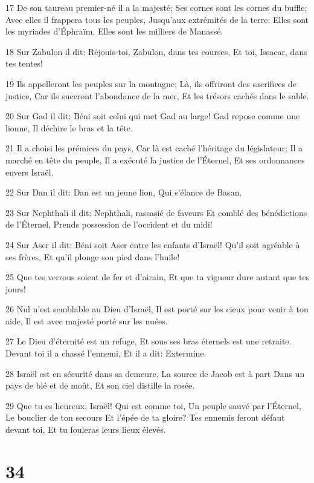 \par 17 De son taureau premier-né il a la majesté; Ses cornes sont les cornes du buffle; Avec elles il frappera tous les peuples, Jusqu'aux extrémités de la terre: Elles sont les myriades d'Éphraïm, Elles sont les milliers de Manassé.
\par 18 Sur Zabulon il dit: Réjouis-toi, Zabulon, dans tes courses, Et toi, Issacar, dans tes tentes!
\par 19 Ils appelleront les peuples sur la montagne; Là, ils offriront des sacrifices de justice, Car ils suceront l'abondance de la mer, Et les trésors cachés dans le sable.
\par 20 Sur Gad il dit: Béni soit celui qui met Gad au large! Gad repose comme une lionne, Il déchire le bras et la tête.
\par 21 Il a choisi les prémices du pays, Car là est caché l'héritage du législateur; Il a marché en tête du peuple, Il a exécuté la justice de l'Éternel, Et ses ordonnances envers Israël.
\par 22 Sur Dan il dit: Dan est un jeune lion, Qui s'élance de Basan.
\par 23 Sur Nephthali il dit: Nephthali, rassasié de faveurs Et comblé des bénédictions de l'Éternel, Prends possession de l'occident et du midi!
\par 24 Sur Aser il dit: Béni soit Aser entre les enfants d'Israël! Qu'il soit agréable à ses frères, Et qu'il plonge son pied dans l'huile!
\par 25 Que tes verrous soient de fer et d'airain, Et que ta vigueur dure autant que tes jours!
\par 26 Nul n'est semblable au Dieu d'Israël, Il est porté sur les cieux pour venir à ton aide, Il est avec majesté porté sur les nuées.
\par 27 Le Dieu d'éternité est un refuge, Et sous ses bras éternels est une retraite. Devant toi il a chassé l'ennemi, Et il a dit: Extermine.
\par 28 Israël est en sécurité dans sa demeure, La source de Jacob est à part Dans un pays de blé et de moût, Et son ciel distille la rosée.
\par 29 Que tu es heureux, Israël! Qui est comme toi, Un peuple sauvé par l'Éternel, Le bouclier de ton secours Et l'épée de ta gloire? Tes ennemis feront défaut devant toi, Et tu fouleras leurs lieux élevés.

\chapter{34}

